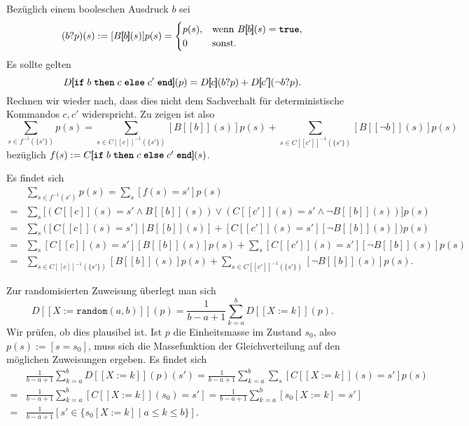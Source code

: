 \documentclass[8pt,fleqn,aspectratio=169]{beamer}
\newcommand{\kw}[1]{\textbf{\texttt{#1}}}
\newcommand{\qb}[1]{[\!\![#1]\!\!]}
\begin{document}
\begin{frame}
Bezüglich einem booleschen Ausdruck $b$ sei
\[(b?p)(s) := [B\qb{b}(s)]p(s) = \begin{cases}
p(s), & \text{wenn $B\qb{b}(s)=\kw{true}$},\\
0 & \text{sonst}.
\end{cases}\]
Es sollte gelten
\[D\qb{\kw{if}\; b\;\kw{then}\;c\;\kw{else}\;c'\;\kw{end}}(p)
= D\qb{c}(b?p) + D\qb{c'}(\lnot b?p).\]\pause
Rechnen wir wieder nach, dass dies nicht dem Sachverhalt für deterministische
Kommandos $c,c'$ widerspricht. Zu zeigen ist also
\[\sum_{s\in f^{-1}(\{s'\})}p(s) = \sum_{s\in C\qb{c}^{-1}(\{s'\})}[B\qb{b}(s)]p(s)
+ \sum_{s\in C\qb{c'}^{-1}(\{s'\})}[B\qb{\lnot b}(s)]p(s)\]
bezüglich $f(s) := C\qb{\kw{if}\; b\;\kw{then}\;c\;\kw{else}\;c'\;\kw{end}}(s)$.
\end{frame}

\begin{frame}
Es findet sich
\begin{align*}
&\sum_{s\in f^{-1}(s')}p(s) = \sum_s [f(s)=s']p(s)\\
= &\sum_s \bigg[(C\qb{c}(s)=s'\land B\qb{b}(s))\lor (C\qb{c'}(s)=s'\land\lnot B\qb{b}(s))\bigg]p(s)\\
= &\sum_s \bigg([C\qb{c}(s)=s'][B\qb{b}(s)] + [C\qb{c'}(s)=s'][\lnot B\qb{b}(s)]\bigg)p(s)\\
= &\sum_s [C\qb{c}(s)=s'][B\qb{b}(s)]p(s) + \sum_s [C\qb{c'}(s)=s'][\lnot B\qb{b}(s)]p(s)\\
= &\sum_{s\in C\qb{c}^{-1}(\{s'\})}[B\qb{b}(s)]p(s) + \sum_{s\in C\qb{c'}^{-1}(\{s'\})} [\lnot B\qb{b}(s)]p(s).
\end{align*}
\end{frame}

\begin{frame}
Zur randomisierten Zuweisung überlegt man sich
\[D\qb{X:=\mathtt{random}(a,b)}(p) = \frac{1}{b-a+1}\sum_{k=a}^b D\qb{X:=k}(p).\]\pause
Wir prüfen, ob dies plausibel ist. Ist $p$ die Einheitsmasse im Zustand
$s_0$, also $p(s):=[s=s_0]$, muss sich die Massefunktion der
Gleichverteilung auf den möglichen Zuweisungen ergeben.\pause{} Es findet sich
\begin{align*}
&\frac{1}{b-a+1}\sum_{k=a}^b D\qb{X:=k}(p)(s')
= \frac{1}{b-a+1}\sum_{k=a}^b\sum_s [C\qb{X:=k}(s)=s']p(s)\\
=& \frac{1}{b-a+1}\sum_{k=a}^b [C\qb{X:=k}(s_0)=s']
= \frac{1}{b-a+1}\sum_{k=a}^b [s_0[X:=k]=s']\\
=& \frac{1}{b-a+1}[s'\in \{s_0[X:=k]\mid a\le k\le b\}].
\end{align*}
\end{frame}
\end{document}
